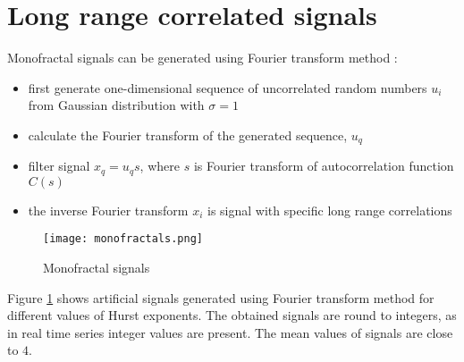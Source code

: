 \section{Long range correlated signals}



Monofractal signals can be generated using Fourier transform method \cite{makse1996method}:
\begin{itemize}
	\item first generate one-dimensional sequence of uncorrelated random numbers $u_i$ from Gaussian distribution with $\sigma=1$
	\item calculate the Fourier transform of the generated sequence, $u_q$
	\item filter signal $x_q = u_q s$, where $s$ is Fourier transform of autocorrelation function $C(s)$ 
	\item the inverse Fourier transform $x_i$ is signal with specific long range correlations 
\end{itemize}     

\begin{figure}[h!]
	\centering
	\texttt{[image: monofractals.png]}
	
	\caption{Monofractal signals}\label{fig:monofractals}
\end{figure}

Figure \ref{fig:monofractals} shows artificial signals generated using Fourier transform method for different values of Hurst exponents. The obtained signals are round to integers, as in real time series integer values are present. The mean values of signals are close to $4$. 


